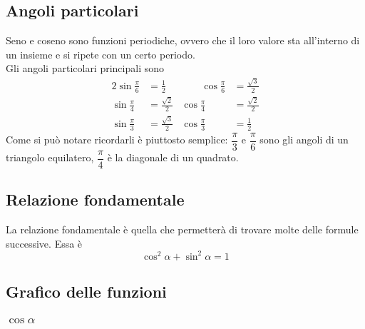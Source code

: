 \subsection{Angoli particolari}
Seno e coseno sono funzioni periodiche, ovvero che il loro valore sta all'interno di un insieme e si
ripete con un certo periodo.\\
Gli angoli particolari principali sono
\begin{alignat*}{2}
  \sin\frac{\pi}{6} &= \frac{1}{2} &\qquad \cos\frac{\pi}{6} &= \frac{\sqrt{3}}{2}\\
  \sin\frac{\pi}{4} &= \frac{\sqrt{2}}{2} & \cos\frac{\pi}{4} &= \frac{\sqrt{2}}{2}\\
  \sin\frac{\pi}{3} &= \frac{\sqrt{3}}{2} & \cos\frac{\pi}{3} &= \frac{1}{2}
\end{alignat*}
Come si può notare ricordarli è piuttosto semplice: $\dfrac{\pi}{3}$ e $\dfrac{\pi}{6}$ sono gli 
angoli di un triangolo equilatero, $\dfrac{\pi}{4}$ è la diagonale di un quadrato.

\subsection{Relazione fondamentale}
La relazione fondamentale è quella che permetterà di trovare molte delle formule successive. Essa è
\begin{equation*}
  \cos^2\alpha + \sin^2\alpha = 1
\end{equation*}

\subsection{Grafico delle funzioni}
\subsubsection{$\cos\alpha$}
\begin{center}
\end{center}
